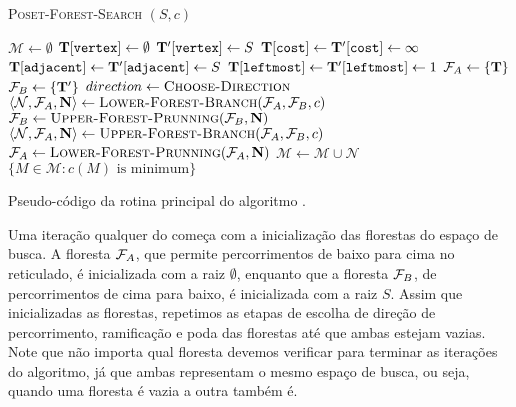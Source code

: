 \begin{algorithm}[]
\textsc{Poset-Forest-Search} $(S, c)$
\begin{algorithmic}[1]
    \State $\mathcal{M} \gets \emptyset$
    \State $\mathbf T[\texttt{vertex}] \gets \emptyset$
    \State $\mathbf T'[\texttt{vertex}] \gets S$
    \State $\mathbf T[\texttt{cost}] \gets \mathbf T'[\texttt{cost}] \gets \infty$
    \State $\mathbf T[\texttt{adjacent}] \gets \mathbf T'[\texttt{adjacent}] \gets S$
    \State $\mathbf T[\texttt{leftmost}] \gets \mathbf T'[\texttt{leftmost}] \gets 1$
    \State $\mathcal{F}_A \gets \{\mathbf T\}$
    \State $\mathcal{F}_B \gets \{\mathbf T'\}$
     
        \State $direction \gets {\normalfont\textsc{Choose-Direction}}$
            \State $\langle \mathcal{N}, \mathcal{F}_A, \mathbf N \rangle \gets {\normalfont\textsc{Lower-Forest-Branch}} (\mathcal{F}_A, \mathcal{F}_B, c)$
            \State $\mathcal{F}_B \gets {\normalfont\textsc{Upper-Forest-Prunning}} (\mathcal{F}_B, \mathbf N)$
        \Else
            \State $\langle \mathcal{N}, \mathcal{F}_A, \mathbf N \rangle \gets {\normalfont\textsc{Upper-Forest-Branch}} (\mathcal{F}_A, \mathcal{F}_B, c)$
            \State $\mathcal{F}_A \gets {\normalfont\textsc{Lower-Forest-Prunning}} (\mathcal{F}_A, \mathbf N)$
        \EndIf
        \State $\mathcal{M} \gets \mathcal{M} \cup \mathcal{N}$
    \EndWhile
    \Return $\{M \in \mathcal{M} : c(M) \text{ is minimum}\}$
\end{algorithmic}
\vspace{1em}
\caption{Pseudo-código da rotina principal do algoritmo .}
\label{pfs:code:pfs:A}
\end{algorithm}

Uma iteração qualquer do  começa com a inicialização das 
florestas do espaço de busca. A floresta $\mathcal{F}_A$, que permite 
percorrimentos de baixo para cima no reticulado, é inicializada com 
a raiz $\emptyset$, enquanto que a floresta $\mathcal{F}_B$, de percorrimentos
de cima para baixo, é inicializada com a raiz $S$. Assim que 
inicializadas as florestas, repetimos as etapas de escolha de direção
de percorrimento, ramificação e poda das florestas até que ambas 
estejam vazias. Note que não importa qual floresta devemos verificar
para terminar as iterações do algoritmo, já que ambas representam o 
mesmo espaço de busca, ou seja, quando uma floresta é vazia a outra 
também é.


